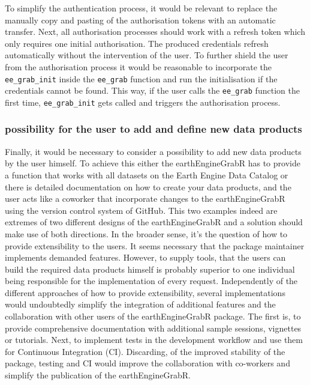To simplify the authentication process, it would be relevant to replace the manually copy and pasting of the authorisation tokens with an automatic transfer. Next, all authorisation processes should work with a refresh token which only requires one initial authorisation. The produced credentials refresh automatically without the intervention of the user. To further shield the user from the authorisation process it would be reasonable to incorporate the \texttt{ee\_grab\_init} inside the \texttt{ee\_grab} function and run the initialisation if the credentials cannot be found. This way, if the user calls the \texttt{ee\_grab} function the first time, \texttt{ee\_grab\_init} gets called and triggers the authorisation process. 

\subsubsection{possibility for the user to add and define new data products}

Finally, it would be necessary to consider a possibility to add new data products by the user himself. To achieve this either the earthEngineGrabR has to provide a function that works with all datasets on the Earth Engine Data Catalog or there is detailed documentation on how to create your data products, and the user acts like a coworker that incorporate changes to the earthEngineGrabR using the version control system of GitHub. This two examples indeed are extremes of two different designs of the earthEngineGrabR and a solution should make use of both directions. In the broader sense, it's the question of how to provide extensibility to the users. It seems necessary that the package maintainer implements demanded features. However, to supply tools, that the users can build the required data products himself is probably superior to one individual being responsible for the implementation of every request.
Independently of the different approaches of how to provide extensibility, several implementations would undoubtedly simplify the integration of additional features and the collaboration with other users of the earthEngineGrabR package. The first is, to provide comprehensive documentation with additional sample sessions, vignettes or tutorials. Next, to implement tests in the development workflow and use them for Continuous Integration (CI). Discarding, of the improved stability of the package, testing and CI would improve the collaboration with co-workers and simplify the publication of the earthEngineGrabR. 

